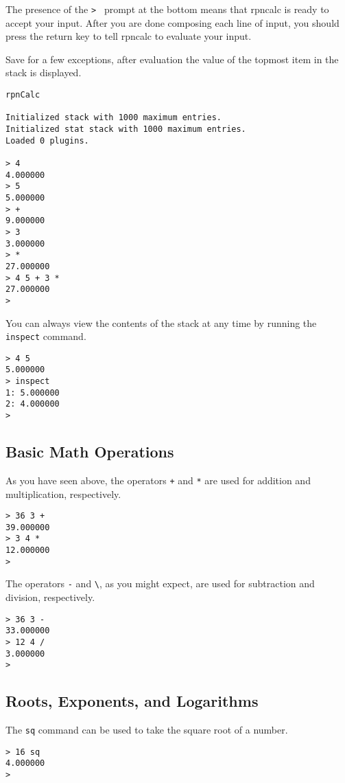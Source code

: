 \documentclass[12pt,letterpaper]{book}
\begin{document}
The presence of the \verb|> | prompt at the bottom means that rpncalc is ready to accept your input. After you are done composing each line of input, you should press the return key to tell rpncalc to evaluate your input.

Save for a few exceptions, after evaluation the value of the topmost item in the stack is displayed.

\begin{lstlisting}
rpnCalc

Initialized stack with 1000 maximum entries.
Initialized stat stack with 1000 maximum entries.
Loaded 0 plugins.

> 4
4.000000
> 5
5.000000
> +
9.000000
> 3
3.000000
> *
27.000000
> 4 5 + 3 *
27.000000
> 
\end{lstlisting}

You can always view the contents of the stack at any time by running the \verb|inspect| command.

\begin{lstlisting}
> 4 5 
5.000000
> inspect
1: 5.000000
2: 4.000000
> 
\end{lstlisting}

\subsection{Basic Math Operations}

As you have seen above, the operators \verb|+| and \verb|*| are used for addition and multiplication, respectively.

\begin{lstlisting}
> 36 3 +
39.000000
> 3 4 *
12.000000
> 
\end{lstlisting}

The operators \verb|-| and \verb|\|, as you might expect, are used for subtraction and division, respectively.

\begin{lstlisting}
> 36 3 -
33.000000
> 12 4 /
3.000000
> 
\end{lstlisting}

\subsection{Roots, Exponents, and Logarithms}

The \verb|sq| command can be used to take the square root of a number.

\begin{lstlisting}
> 16 sq
4.000000
> 
\end{lstlisting}
\end{document}
